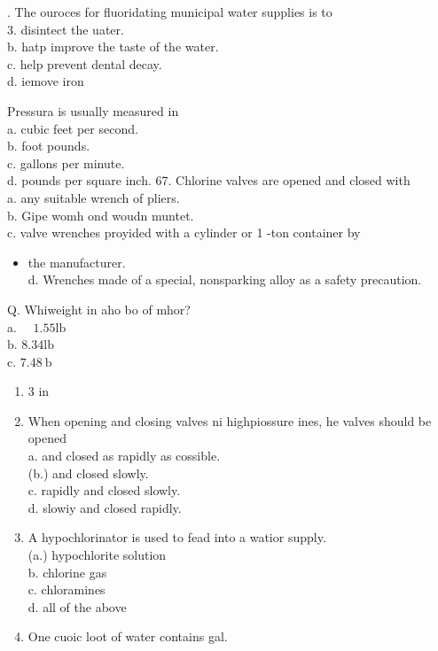 \documentclass[10pt]{article}
\begin{document}
. The ouroces for fluoridating municipal water supplies is to\\
3. disintect the uater.\\
b. hatp improve the taste of the water.\\
c. help prevent dental decay.\\
d. iemove iron

 Pressura is usually measured in\\
a. cubic feet per second.\\
b. foot pounds.\\
c. gallons per minute.\\
d. pounds per square inch. 67. Chlorine valves are opened and closed with\\
a. any suitable wrench of pliers.\\
b. Gipe womh ond woudn muntet.\\
c. valve wrenches proyided with a cylinder or 1 -ton container by

\begin{itemize}
  \item the manufacturer.\\
d. Wrenches made of a special, nonsparking alloy as a safety precaution.
\end{itemize}

Q. Whiweight in aho bo of mhor?\\
a. $\quad 1.55 \mathrm{lb}$\\
b. $8.34 \mathrm{lb}$\\
c. $7.48 \mathrm{~b}$

\begin{enumerate}
  \item 3 in

  \item When opening and closing valves ni highpiossure ines, he valves should be opened\\
a. and closed as rapidly as cossible.\\
(b.) and closed slowly.\\
c. rapidly and closed slowly.\\
d. slowiy and closed rapidly.

  \item A hypochlorinator is used to fead into a watior supply.\\
(a.) hypochlorite solution\\
b. chlorine gas\\
c. chloramines\\
d. all of the above

  \item One cuoic loot of water contains gal.

\end{enumerate}
\end{document}
